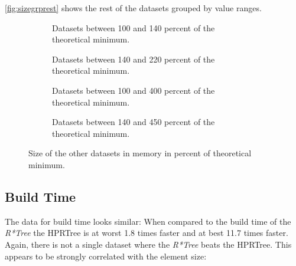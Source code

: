 \autoref{fig:sizegrprest} shows the rest of the datasets grouped by value ranges.

\begin{figure}[H]
    \centering
    \begin{subfigure}{0.458\textwidth}
        
        \caption[Datasets between 100 and 140 percent of the theoretical minimum.]{Datasets between 100 and 140 percent of the theoretical minimum.}
        \label{sfig:sizegrp144}
    \end{subfigure}\hfill
    \begin{subfigure}{0.458\textwidth}
        
        \caption[Datasets between 140 and 220 percent of the theoretical minimum.]{Datasets between 140 and 220 percent of the theoretical minimum.}
        \label{sfig:sizegrp240}
    \end{subfigure}\hfill
    \begin{subfigure}{0.458\textwidth}
        
        \caption[Datasets between 100 and 400 percent of the theoretical minimum.]{Datasets between 100 and 400 percent of the theoretical minimum.}
        \label{sfig:sizegrp420}
    \end{subfigure}\hfill
    \begin{subfigure}{0.458\textwidth}
        
        \caption[Datasets between 140 and 450 percent of the theoretical minimum.]{Datasets between 140 and 450 percent of the theoretical minimum.}
        \label{sfig:sizegrp480}
    \end{subfigure}
    \caption[Size of the other datasets in memory in percent of theoretical minimum.]{Size of the other datasets in memory in percent of theoretical minimum.}
    \label{fig:sizegrprest}
\end{figure}

\subsection{Build Time}

The data for build time looks similar: When compared to the build time of the \textit{R*Tree} the \acs{HPRTree} is at worst 1.8 times faster and at best 11.7 times faster. Again, there is not a single dataset where the \textit{R*Tree} beats the \acs{HPRTree}. This appears to be strongly correlated with the element size:

